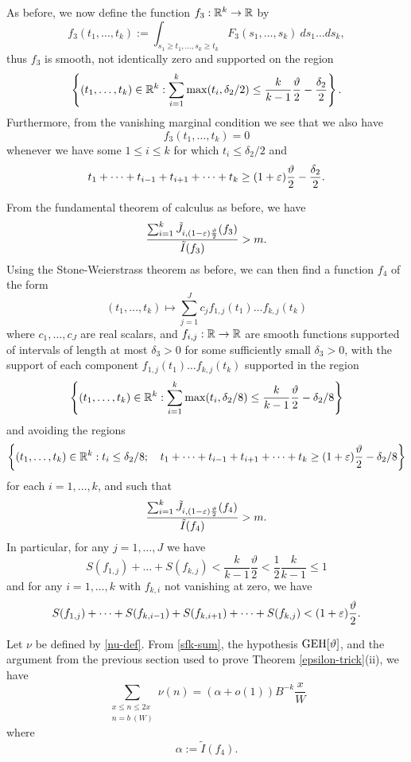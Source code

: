 As before, we now define the function $f_3: \mathbb{R}^k \to \mathbb{R}$ by
$$ f_3(t_1,\dots,t_k) := \int_{s_1 \geq t_1, \dots, s_k \geq t_k} F_3(s_1,\dots,s_k)\ ds_1 \dots ds_k,$$
thus $f_3$ is smooth, not identically zero and supported on the region
$$ \left\{ (t_1,\dots,t_k) \in \mathbb{R}^k: \sum_{i=1}^k \max(t_i, \delta_2/2) \leq \frac{k}{k-1} \frac{\vartheta}{2} - \frac{\delta_2}{2} \right\}.$$
Furthermore, from the vanishing marginal condition we see that we also have
$$ f_3(t_1,\dots,t_k) =0 $$
whenever we have some $1 \leq i \leq k$ for which $t_i \leq \delta_2/2$ and
$$ t_1 + \dots + t_{i-1} + t_{i+1} + \dots + t_k \geq (1+\varepsilon) \frac{\vartheta}{2} - \frac{\delta_2}{2}.$$

From the fundamental theorem of calculus as before, we have
$$
\frac{\sum_{i=1}^k \tilde J_{i,(1-\varepsilon) \frac{\vartheta}{2}}(f_3)}{\tilde I(f_3)} > m.
$$
Using the Stone-Weierstrass theorem as before, we can then find a function $f_4$ of the form
\begin{equation}\label{cff-again}
 (t_1,\dots,t_k) \mapsto \sum_{j=1}^J c_j f_{1,j}(t_1) \dots f_{k,j}(t_k)
\end{equation}
where $c_1,\dots,c_J$ are real scalars, and $f_{i,j}: \mathbb{R} \to \mathbb{R}$ are smooth functions supported of intervals of length at most $\delta_3>0$ for some sufficiently small $\delta_3>0$, with the support of each component
$f_{1,j}(t_1) \dots f_{k,j}(t_k)$ supported in the region
$$ \left\{ (t_1,\dots,t_k) \in \mathbb{R}^k: \sum_{i=1}^k \max(t_i, \delta_2/8) \leq \frac{k}{k-1} \frac{\vartheta}{2} - \delta_2/8 \right\}$$
and avoiding the regions
$$ \left\{ (t_1,\dots,t_k) \in \mathbb{R}^k: t_i \leq \delta_2/8; \quad  t_1 + \dots + t_{i-1} + t_{i+1} + \dots + t_k \geq (1+\varepsilon) \frac{\vartheta}{2} - \delta_2/8 \right\}$$
for each $i=1,\dots,k$, and such that
$$
\frac{\sum_{i=1}^k \tilde J_{i,(1-\varepsilon) \frac{\vartheta}{2}}(f_4)}{\tilde I(f_4)} > m.
$$
In particular, for any $j=1,\dots,J$ we have
\begin{equation}\label{sfk-sum}
S(f_{1,j}) + \dots + S(f_{k,j}) < \frac{k}{k-1} \frac{\vartheta}{2} < \frac{1}{2} \frac{k}{k-1} \leq 1
\end{equation}
and for any $i=1,\dots,k$ with $f_{k,i}$ not vanishing at zero, we have
\begin{equation}\label{sfk-sum-2} 
S(f_{1,j}) + \dots + S(f_{k,i-1}) + S(f_{k,i+1}) + \dots + S(f_{k,j}) < (1+\varepsilon) \frac{\vartheta}{2}.
\end{equation}

Let $\nu$ be defined by \eqref{nu-def}.
From \eqref{sfk-sum}, the hypothesis $\operatorname*{GEH}[\vartheta]$, and the argument from the previous section used to prove Theorem \ref{epsilon-trick}(ii), we have
$$ \sum_{\substack{x \leq n \leq 2x\\ n = b\ (W)}} \nu(n) = (\alpha + o(1)) B^{-k} \frac{x}{W}$$
where 
$$ \alpha := \tilde I(f_4).$$

